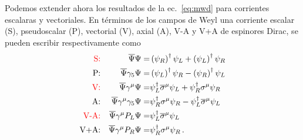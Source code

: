 Podemos extender ahora los resultados de la ec.~\eqref{eq:mwd} para corrientes escalaras y vectoriales. En términos de los campos de Weyl una corriente escalar (S), pseudoscalar (P), vectorial (V), axial (A),  V-A y V+A de espinores Dirac, se pueden escribir respectivamente como
\begin{align}
\label{eq:8}
\color{red}\text{S:} &&  \overline{\Psi}\Psi =& \left( \psi_R \right)^\dagger \psi_L+\left( \psi_L \right)^{\dagger}\psi_R \nonumber\\
\text{P:} &&  \overline{\Psi}\gamma_5\Psi =& \left( \psi_L \right)^{\dagger}\psi_R-\left( \psi_R \right)^\dagger \psi_L \nonumber\\
\color{red}\text{V:}& &  \overline{\Psi}\gamma^{\mu}\Psi=& \psi_L^{\dagger}\overline{\sigma}^{\mu}\psi_L+\psi_R^{\dagger}\sigma^{\mu}\psi_{R}\nonumber\\
\text{A:}& &  \overline{\Psi}\gamma^{\mu}\gamma_5\Psi=&\psi_R^{\dagger}\sigma^{\mu}\psi_{R}- \psi_L^{\dagger}\overline{\sigma}^{\mu}\psi_L\nonumber\\
\color{red}\text{V-A:} && \overline{\Psi}\gamma^{\mu}P_L\Psi=& \psi_L^{\dagger}\overline{\sigma}^{\mu}\psi_L\nonumber\\
\text{V+A:} && \overline{\Psi}\gamma^{\mu}P_R\Psi=& \psi_R^{\dagger}{\sigma}^{\mu}\psi_R\,.
\end{align}


